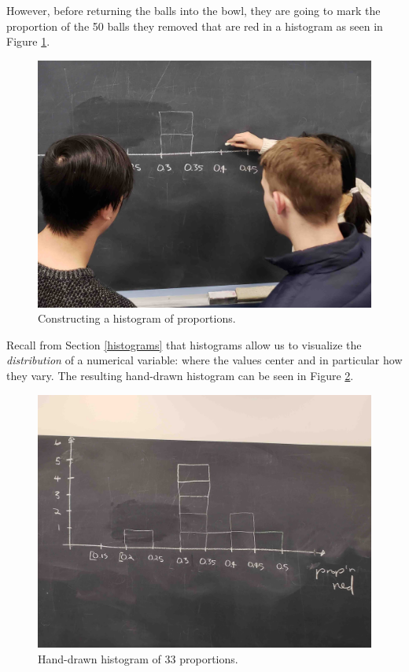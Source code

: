 \documentclass[12pt, krantz2,]{krantz}
\begin{document}
However, before returning the balls into the bowl, they are going to mark the proportion of the 50 balls they removed that are red in a histogram as seen in Figure \ref{fig:sampling-exercise-4}.

\begin{figure}

{\centering \includegraphics[width=0.8\linewidth]{images/sampling/balls/tactile_3_a} 

}

\caption{Constructing a histogram of proportions.}\label{fig:sampling-exercise-4}
\end{figure}

Recall from Section \ref{histograms} that histograms allow us to visualize the \emph{distribution} of a numerical variable: where the values center and in particular how they vary. The resulting hand-drawn histogram can be seen in Figure \ref{fig:sampling-exercise-5}.

\begin{figure}

{\centering \includegraphics[width=0.8\linewidth]{images/sampling/balls/tactile_3_c} 

}

\caption{Hand-drawn histogram of 33 proportions.}\label{fig:sampling-exercise-5}
\end{figure}
\end{document}

